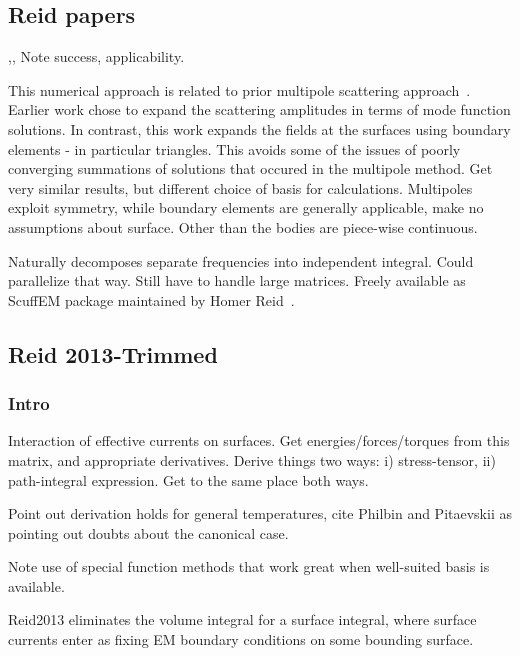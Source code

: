 \subsection{Reid papers}

\cite{Reid2009},\cite{Reid2011}, \cite{Reid2013} 
Note success, applicability.  

This numerical approach is related to prior multipole scattering approach~\cite{Rahi2009}.
Earlier work chose to expand the scattering amplitudes in terms of mode function
solutions.  In contrast, this work expands the fields at the surfaces using 
boundary elements - in particular triangles.  
This avoids some of the issues of poorly converging summations of solutions that occured in
the multipole method.  Get very similar results, but different choice of basis for calculations.
Multipoles exploit symmetry, while boundary elements are generally applicable, make no assumptions 
about surface.  Other than the bodies are piece-wise continuous.  

Naturally decomposes separate frequencies into independent integral.  Could parallelize that way.
Still have to handle large matrices.  Freely available as ScuffEM package maintained by
 Homer Reid~\cite{ScuffEM2016}.  

\subsection{Reid 2013-Trimmed}

\subsubsection{Intro}

Interaction of effective currents on surfaces.  Get energies/forces/torques from
this matrix, and appropriate derivatives.  Derive things two ways:
i) stress-tensor, ii) path-integral expression.  Get to the same place both ways.  

Point out derivation holds for general temperatures, cite Philbin and Pitaevskii
as pointing out doubts about the canonical case.  

Note use of special function methods that work great when well-suited basis is 
available.  

Reid2013 eliminates the volume integral for a surface integral, where surface currents
enter as fixing EM boundary conditions on some bounding surface.    

